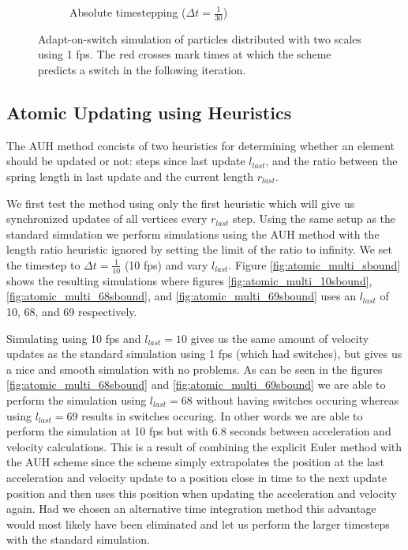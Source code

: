 \documentclass[11pt]{article}
\begin{document}
\begin{figure}[H]
\begin{subfigure}[t]{0.5\textwidth}
        \caption{Absolute timestepping ($\Delta t = \frac{1}{30}$)}
        \label{fig:switch_multi_1fps_absolute}
    \end{subfigure}
    \caption{Adapt-on-switch simulation of particles distributed with two
scales using 1 fps. The red crosses mark times at which the scheme predicts a
switch in the following iteration.}
    \label{fig:switch}
\end{figure}

\subsection{Atomic Updating using Heuristics}
\label{sec:experiments_atomic}
The AUH method concists of two heuristics for determining whether an element
should be updated or not: steps since last update $l_{last}$, and the ratio
between the spring length in last update and the current length $r_{last}$.

We first test the method using only the first heuristic which will give
us synchronized updates of all vertices every $r_{last}$ step. Using the
same setup as the standard simulation we perform simulations using the AUH
method with the length ratio heuristic ignored by setting the limit of
the ratio to infinity. We set the timestep to $\Delta t = \frac{1}{10}$
(10 fps) and vary $l_{last}$. Figure \ref{fig:atomic_multi_sbound} shows
the resulting simulations where figures \ref{fig:atomic_multi_10sbound},
\ref{fig:atomic_multi_68sbound}, and \ref{fig:atomic_multi_69sbound} uses
an $l_{last}$ of 10, 68, and 69 respectively.

Simulating using 10 fps and $l_{last} = 10$ gives us the same amount
of velocity updates as the standard simulation using 1 fps (which had
switches), but gives us a nice and smooth simulation with no problems.
As can be seen in the figures \ref{fig:atomic_multi_68sbound} and
\ref{fig:atomic_multi_69sbound} we are able to perform the simulation using
$l_{last} = 68$ without having switches occuring whereas using $l_{last} =
69$ results in switches occuring. In other words we are able to perform the
simulation at 10 fps but with 6.8 seconds between acceleration and velocity
calculations. This is a result of combining the explicit Euler method with
the AUH scheme since the scheme simply extrapolates the position at the last
acceleration and velocity update to a position close in time to the next
update position and then uses this position when updating the acceleration and
velocity again. Had we chosen an alternative time integration method this
advantage would most likely have been eliminated and let us perform the larger
timesteps with the standard simulation.
\end{document}
